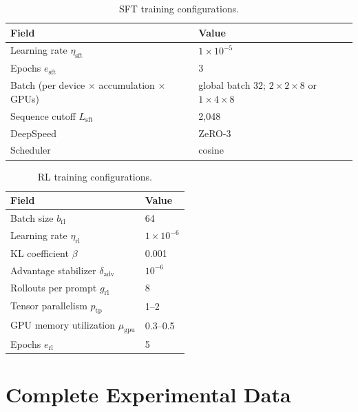 \begin{table}[H]
\centering
\small
\setlength{\tabcolsep}{5pt}
\begin{tabular}{p{4.3cm}p{7.2cm}}
\toprule
\rowcolor{algobg}
Field & Value \\
\midrule
Learning rate \(\eta_{\mathrm{sft}}\) & \(1\times10^{-5}\) \\
Epochs \(e_{\mathrm{sft}}\) & 3 \\
Batch (per device \(\times\) accumulation \(\times\) GPUs)
  & global batch 32; \(2\times2\times8\) or \(1\times4\times8\) \\
Sequence cutoff \(L_{\mathrm{sft}}\) & 2,048 \\
DeepSpeed & ZeRO-3 \\
Scheduler & cosine \\
\bottomrule
\end{tabular}
\caption{SFT training configurations.}
\label{tab:sft-training-config}
\end{table}

\begin{table}[H]
\centering
\small
\setlength{\tabcolsep}{5pt}
\begin{tabular}{p{4.3cm}p{7.2cm}}
\toprule
\rowcolor{algobg}
Field & Value \\
\midrule
Batch size \(b_{\mathrm{rl}}\) & 64 \\
Learning rate \(\eta_{\mathrm{rl}}\) & \(1\times10^{-6}\) \\
KL coefficient \(\beta\) & 0.001 \\
Advantage stabilizer \(\delta_{\mathrm{adv}}\) & \(10^{-6}\) \\
Rollouts per prompt \(g_{\mathrm{rl}}\) & 8 \\
Tensor parallelism \(p_{\mathrm{tp}}\) & 1--2 \\
GPU memory utilization \(\mu_{\mathrm{gpu}}\) & 0.3--0.5 \\
Epochs \(e_{\mathrm{rl}}\) & 5 \\
\bottomrule
\end{tabular}
\caption{RL training configurations.}
\label{tab:rl-training-config}
\end{table}

\section{Complete Experimental Data}
\label{app:complete-results}
\begingroup
\setlength{\floatsep}{7pt plus 2pt minus 2pt}
\setlength{\textfloatsep}{7pt plus 2pt minus 2pt}
\setlength{\intextsep}{7pt plus 2pt minus 2pt}

